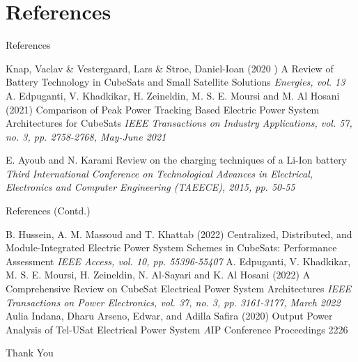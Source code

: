\documentclass[aspectratio=169]{beamer}
\begin{document}
	\section{References}
	\begin{frame}{References}
		
		\begin{thebibliography}{9}
			
			Knap, Vaclav \& Vestergaard, Lars \& Stroe, Daniel-Ioan (2020	)
			\newblock A Review of Battery Technology in CubeSats
			and Small Satellite Solutions
			\newblock \emph{Energies, vol. 13}	
			A. Edpuganti, V. Khadkikar, H. Zeineldin, M. S. E. Moursi and M. Al Hosani (2021)
			\newblock Comparison of Peak Power Tracking Based Electric Power System Architectures for CubeSats
			\newblock \emph{IEEE Transactions on Industry Applications, vol. 57, no. 3, pp. 2758-2768, May-June 2021}
			
			E. Ayoub and N. Karami 
			\newblock Review on the charging techniques of a Li-Ion battery
			\newblock \emph{Third International Conference on Technological Advances in Electrical, Electronics and Computer Engineering (TAEECE), 2015, pp. 50-55}
		\end{thebibliography}
	\end{frame}
	\begin{frame}{References (Contd.)}
		
		\begin{thebibliography}{9}
			
			\bibitem[4]{p1}
			B. Hussein, A. M. Massoud and T. Khattab (2022)
			\newblock Centralized, Distributed, and Module-Integrated Electric Power System Schemes in CubeSats: Performance Assessment
			\newblock \emph{ IEEE Access, vol. 10, pp. 55396-55407}
			A. Edpuganti, V. Khadkikar, M. S. E. Moursi, H. Zeineldin, N. Al-Sayari and K. Al Hosani (2022)
			\newblock A Comprehensive Review on CubeSat Electrical Power System Architectures
			\newblock \emph { IEEE Transactions on Power Electronics, vol. 37, no. 3, pp. 3161-3177, March 2022}
			\bibitem[6]{p1}
			Aulia Indana, Dharu Arseno, Edwar, and Adilla Safira (2020)
			\newblock Output Power Analysis of Tel-USat Electrical Power System 
			\newblock \emph  AIP Conference Proceedings 2226
			
			
			
			
			
			
			
			
			
			
		\end{thebibliography}
	\end{frame}
	
	\begin{frame}
		\huge \center Thank You
		
	\end{frame}
\end{document}
